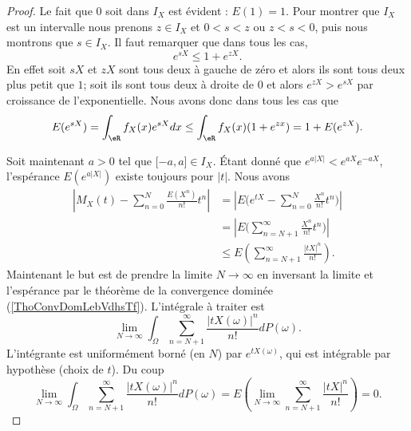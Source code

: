 \begin{proof}
	Le fait que \( 0\) soit dans \( I_X\) est évident : \( E(1)=1\). Pour montrer que \( I_X\) est un intervalle nous prenons \( z\in I_X\) et \( 0<s<z\) ou \( z<s<0\), puis nous montrons que \( s\in I_X\). Il faut remarquer que dans tous les cas,
	\begin{equation}
		e^{sX}\leq 1+ e^{zX}.
	\end{equation}
	En effet soit \( sX\) et \( zX\) sont tous deux à gauche de zéro et alors ils sont tous deux plus petit que \( 1\); soit ils sont tous deux à droite de \( 0\) et alors \( e^{zX}> e^{sX}\) par croissance de l'exponentielle. Nous avons donc dans tous les cas que
	\begin{equation}
		E( e^{sX})=\int_{\eR}f_X(x) e^{sX}dx\leq \int_{\eR}f_X(x)(1+ e^{zx})=1+E( e^{zX}).
	\end{equation}

	Soit maintenant \( a>0\) tel que \( \mathopen[ -a , a \mathclose]\in I_X\). Étant donné que \(  e^{a| X |}< e^{aX} e^{-aX}\), l'espérance \( E( e^{a| X |})\) existe toujours pour \( | t |\). Nous avons
	\begin{subequations}
		\begin{align}
			\left| M_X(t)-\sum_{n=0}^N\frac{ E(X^n) }{ n! }t^n \right| & =\left| E\Big(  e^{tX}-\sum_{n=0}^N\frac{ X^n }{ n! }t^n \Big) \right|  \\
			                                                           & =\left| E\Big( \sum_{n=N+1}^{\infty}\frac{ X^n }{ n! }t^n \Big) \right| \\
			                                                           & \leq E\left( \sum_{n=N+1}^{\infty}\frac{ | tX |^n }{ n! } \right).
		\end{align}
	\end{subequations}
	Maintenant le but est de prendre la limite \( N\to\infty\) en inversant la limite et l'espérance par le théorème de la convergence dominée (\ref{ThoConvDomLebVdhsTf}). L'intégrale à traiter est
	\begin{equation}
		\lim_{N\to \infty} \int_{\Omega}\sum_{n=N+1}^{\infty}\frac{ | tX(\omega) |^n }{ n! }dP(\omega).
	\end{equation}
	L'intégrante est uniformément borné (en \( N\)) par \(  e^{tX(\omega)}\), qui est intégrable par hypothèse (choix de \( t\)). Du coup
	\begin{equation}
		\lim_{N\to \infty} \int_{\Omega}\sum_{n=N+1}^{\infty}\frac{ | tX(\omega) |^n }{ n! }dP(\omega)=E\left( \lim_{N\to \infty} \sum_{n=N+1}^{\infty}\frac{ | tX |^n }{ n! } \right)=0.
	\end{equation}
\end{proof}

